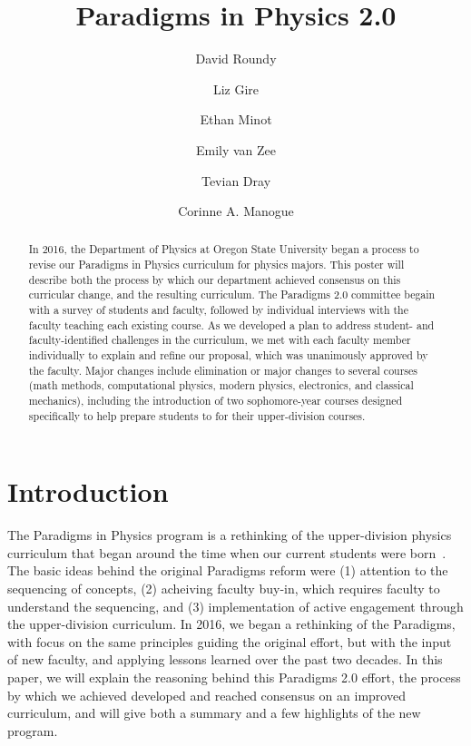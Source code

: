 \documentclass[english,aps,pra,reprint,noshowpacs,superscriptaddress]{revtex4-1}
\begin{document}
\title{Paradigms in Physics 2.0}
\author{David Roundy}
\author{Liz Gire}
\author{Ethan Minot}
\author{Emily van Zee}
\author{Tevian Dray}
\author{Corinne A. Manogue}


\begin{abstract}
In 2016, the Department of Physics at Oregon State University began a
process to revise our Paradigms in Physics curriculum for physics
majors.  This poster will describe both the process by which our
department achieved consensus on this curricular change, and the
resulting curriculum.  The Paradigms 2.0 committee begain with a
survey of students and faculty, followed by individual interviews with
the faculty teaching each existing course.  As we developed a plan to
address student- and faculty-identified challenges in the curriculum,
we met with each faculty member individually to explain and refine our
proposal, which was unanimously approved by the faculty.  Major
changes include elimination or major changes to several courses (math
methods, computational physics, modern physics, electronics, and
classical mechanics), including the introduction of two sophomore-year
courses designed specifically to help prepare students to for their
upper-division courses.
\end{abstract}

\maketitle

\section{Introduction}
The Paradigms in Physics program is a rethinking of the upper-division
physics curriculum that began around the time when our current
students were born~\cite{manogue2001paradigms}.  The basic ideas
behind the original Paradigms reform were (1) attention to the
sequencing of concepts, (2) acheiving faculty buy-in, which requires
faculty to understand the sequencing, and (3) implementation of active
engagement through the upper-division curriculum.  In 2016, we began a
rethinking of the Paradigms, with focus on the same principles guiding
the original effort, but with the input of new faculty, and applying
lessons learned over the past two decades.  In this paper, we will
explain the reasoning behind this Paradigms 2.0 effort, the process by
which we achieved developed and reached consensus on an improved
curriculum, and will give both a summary and a few highlights of the
new program.
\end{document}
